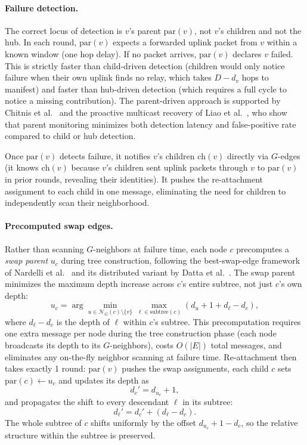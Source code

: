 \documentclass{article}
\begin{document}
\paragraph{Failure detection.} The correct locus of detection is $v$'s parent
$\mathrm{par}(v)$, not $v$'s children and not the hub. In each round, $\mathrm{par}(v)$
expects a forwarded uplink packet from $v$ within a known window (one hop delay). If no
packet arrives, $\mathrm{par}(v)$ declares $v$ failed. This is strictly faster than
child-driven detection (children would only notice failure when their own uplink finds no
relay, which takes $D - d_v$ hops to manifest) and faster than hub-driven detection
(which requires a full cycle to notice a missing contribution). The parent-driven approach
is supported by Chitnis et al.\ \cite{chitnis2009} and the proactive multicast recovery
of Liao et al.\ \cite{liao2007proactive}, who show that parent monitoring minimizes both
detection latency and false-positive rate compared to child or hub detection.

Once $\mathrm{par}(v)$ detects failure, it notifies $v$'s children
$\mathrm{ch}(v)$ directly via $G$-edges (it knows $\mathrm{ch}(v)$ because $v$'s
children sent uplink packets through $v$ to $\mathrm{par}(v)$ in prior rounds, revealing
their identities). It pushes the re-attachment assignment to each child in one message,
eliminating the need for children to independently scan their neighborhood.

\paragraph{Precomputed swap edges.} Rather than scanning $G$-neighbors at failure time,
each node $c$ precomputes a \emph{swap parent} $u_c$ during tree construction, following
the best-swap-edge framework of Nardelli et al.\ \cite{nardelli2003} and its distributed
variant by Datta et al.\ \cite{datta2013}. The swap parent minimizes the maximum depth
increase across $c$'s entire subtree, not just $c$'s own depth:
\[
    u_c = \arg\min_{u \in \mathcal{N}_G(c) \setminus \{v\}} \max_{\ell \in \mathrm{subtree}(c)} (d_u + 1 + d_\ell - d_c),
\]
where $d_\ell - d_c$ is the depth of $\ell$ within $c$'s subtree. This precomputation
requires one extra message per node during the tree construction phase (each node
broadcasts its depth to its $G$-neighbors), costs $O(|E|)$ total messages, and
eliminates any on-the-fly neighbor scanning at failure time. Re-attachment then takes
exactly 1 round: $\mathrm{par}(v)$ pushes the swap assignments, each child $c$ sets
$\mathrm{par}(c) \leftarrow u_c$ and updates its depth as
\[
    d_c' = d_{u_c} + 1,
\]
and propagates the shift to every descendant $\ell$ in its subtree:
\[
    d_\ell' = d_c' + (d_\ell - d_c).
\]
The whole subtree of $c$ shifts uniformly by the offset $d_{u_c} + 1 - d_c$, so the
relative structure within the subtree is preserved.
\end{document}
